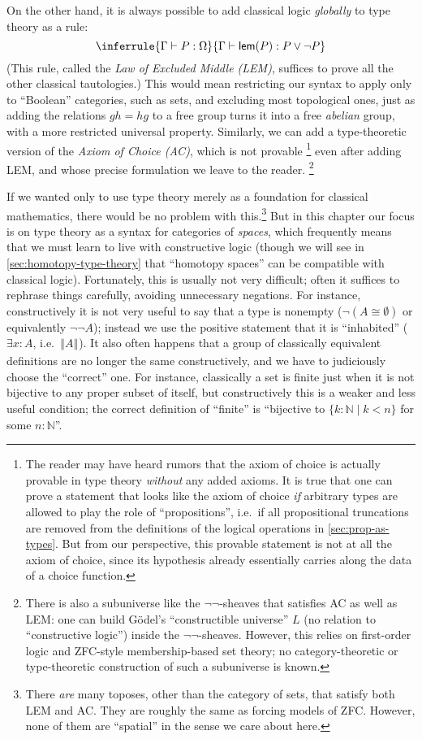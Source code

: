 \documentclass[12pt]{article}
\def\N{\mathbb{N}}
\def\types{\vdash}
\numberwithin{equation}{section}
\newcommand{\trunc}[2]{\mathopen{}\left\Vert #2\right\Vert_{#1}\mathclose{}}
\newcommand{\brck}[1]{\trunc{}{#1}}
\begin{document}
On the other hand, it is always possible to add classical logic \emph{globally} to type theory as a rule:
\[ \inferrule{\Gamma\types P:\Omega}{\Gamma\types \mathsf{lem}(P) : P \vee \neg P} \]
(This rule, called the \emph{Law of Excluded Middle (LEM)}, suffices to prove all the other classical tautologies.)
This would mean restricting our syntax to apply only to ``Boolean'' categories, such as sets, and excluding most topological ones, just as adding the relations $g h = h g$ to a free group turns it into a free \emph{abelian} group, with a more restricted universal property.
Similarly, we can add a type-theoretic version of the \emph{Axiom of Choice (AC)}, which is not provable%
\footnote{The reader may have heard rumors that the axiom of choice is actually provable in type theory \emph{without} any added axioms.
It is true that one can prove a statement that looks like the axiom of choice \emph{if} arbitrary types are allowed to play the role of ``propositions'', i.e.\ if all propositional truncations are removed from the definitions of the logical operations in \cref{sec:prop-as-types}.
But from our perspective, this provable statement is not at all the axiom of choice, since its hypothesis already essentially carries along the data of a choice function.}
even after adding LEM, and whose precise formulation we leave to the reader.%
\footnote{There is also a subuniverse like the $\neg\neg$-sheaves that satisfies AC as well as LEM: one can build G\"odel's ``constructible universe'' $L$ (no relation to ``constructive logic'') inside the $\neg\neg$-sheaves.
  However, this relies on first-order logic and ZFC-style membership-based set theory; no category-theoretic or type-theoretic construction of such a subuniverse is known.}

If we wanted only to use type theory merely as a foundation for classical mathematics, %
there would be no problem with this.\footnote{There \emph{are} many toposes, other than the category of sets, that satisfy both LEM and AC.
  They are roughly the same as forcing models of ZFC.
  However, none of them are ``spatial'' in the sense we care about here.}
But in this chapter our focus is on type theory as a syntax for categories of \emph{spaces}, which frequently means that we must learn to live with constructive logic (though we will see in \cref{sec:homotopy-type-theory} that ``homotopy spaces'' can be compatible with classical logic).
Fortunately, this is usually not very difficult; often it suffices to rephrase things carefully, avoiding unnecessary negations.
For instance, constructively it is not very useful to say that a type is nonempty ($\neg (A \cong \emptyset)$ or equivalently $\neg\neg A$); instead we use the positive statement that it is ``inhabited'' ($\exists x:A$, i.e.\ $\brck{A}$).
It also often happens that a group of classically equivalent definitions are no longer the same constructively, and we have to judiciously choose the ``correct'' one.
For instance, classically a set is finite just when it is not bijective to any proper subset of itself, but constructively  %
this is a weaker and less useful condition; the correct definition of ``finite'' is ``bijective to $\{k:\N \mid k<n \}$ for some $n:\N$''.
\end{document}
